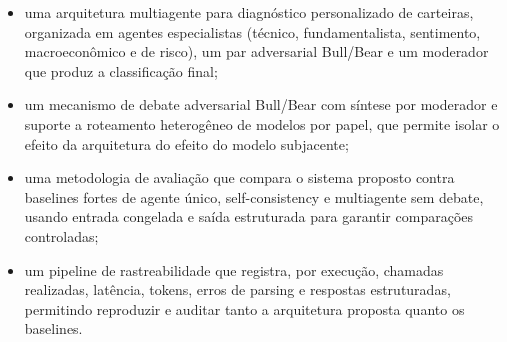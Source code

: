 \begin{itemize}
  \item uma arquitetura multiagente para diagnóstico personalizado de
  carteiras, organizada em agentes especialistas (técnico, fundamentalista,
  sentimento, macroeconômico e de risco), um par adversarial Bull/Bear e um
  moderador que produz a classificação final;
  \item um mecanismo de debate adversarial Bull/Bear com síntese por
  moderador e suporte a roteamento heterogêneo de modelos por papel, que
  permite isolar o efeito da arquitetura do efeito do modelo subjacente;
  \item uma metodologia de avaliação que compara o sistema proposto contra
  baselines fortes de agente único, self-consistency e multiagente sem
  debate, usando entrada congelada e saída estruturada para garantir
  comparações controladas;
  \item um pipeline de rastreabilidade que registra, por execução, chamadas
  realizadas, latência, tokens, erros de parsing e respostas estruturadas,
  permitindo reproduzir e auditar tanto a arquitetura proposta quanto os
  baselines.
\end{itemize}
